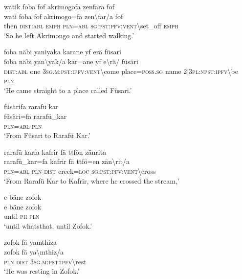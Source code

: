 \ea\label{ex:1:a3688}
watik foba fof akrimogofa zenfara fof\\
\gll wati	foba	fof	akrimogo=fa	zen{\textbackslash}far/a	fof\\
     then	\textsc{dist}:\textsc{abl}	\textsc{emph}	\textsc{pln}=\textsc{abl}	\textsc{sg}:\textsc{pst}:\textsc{pfv}:\textsc{vent}{\textbackslash}set\_off	\textsc{emph}\\
\glt `So he left Akrimongo and started walking.'
\z

\ea\label{ex:1:a3690}
foba näbi yaniyaka karane yf erä füsari\\
\gll foba	näbi	yan{\textbackslash}yak/a	kar=ane	yf	e{\textbackslash}rä/	füsäri\\
     \textsc{dist}:\textsc{abl}	one	3\textsc{sg}.\textsc{m}:\textsc{pst}:\textsc{ipfv}:\textsc{vent}{\textbackslash}come	place=\textsc{poss}.\textsc{sg}	name	2|3\textsc{pl}:\textsc{npst}:\textsc{ipfv}{\textbackslash}be	\textsc{pln}\\
\glt `He came straight to a place called Füsari.'
\z

\ea\label{ex:1:a3691}
füsärifa rarafü kar\\
\gll füsäri=fa	rarafü\_kar\\
     \textsc{pln}=\textsc{abl}	\textsc{pln}\\
\glt `From Füsari to Rarafü Kar.'
\z

\ea\label{ex:1:a3693}
rarafü karfa kafrir fä ttfön zänrita\\
\gll rarafü\_kar=fa	kafrir	fä	ttfö=en	zän{\textbackslash}rit/a\\
     \textsc{pln}=\textsc{abl}	\textsc{pln}	\textsc{dist}	creek=\textsc{loc}	\textsc{sg}:\textsc{pst}:\textsc{pfv}:\textsc{vent}{\textbackslash}cross\\
\glt `From Rarafü Kar to Kafrir, where he crossed the stream,'
\z

\ea\label{ex:1:a3695}
e bäne zofok\\
\gll e	bäne	zofok\\
     until	\textsc{ph}	\textsc{pln}\\
\glt `until whatsthat, until Zofok.'
\z

\ea\label{ex:1:a3697}
zofok fä yamthiza\\
\gll zofok	fä	ya{\textbackslash}mthiz/a\\
     \textsc{pln}	\textsc{dist}	3\textsc{sg}.\textsc{m}:\textsc{pst}:\textsc{ipfv}{\textbackslash}rest\\
\glt `He was resting in Zofok.'
\z

